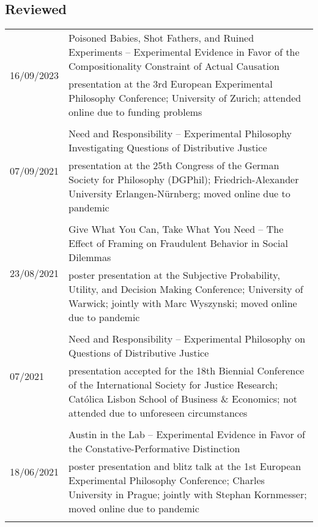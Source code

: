 \documentclass[a4paper,10pt]{article}
\begin{document}
\subsection*{Reviewed}
\begin{longtable}{p{}p{11cm}}
\multirow{2}{2,25cm}{\footnotesize{16/09/2023}} & Poisoned Babies, Shot Fathers, and Ruined Experiments -- Experimental Evidence in Favor of the Compositionality Constraint of Actual Causation\\
& \footnotesize{presentation at the 3rd European Experimental Philosophy Conference; University of Zurich; attended online due to funding problems}\\
\\
\multirow{2}{2,25cm}{\footnotesize{07/09/2021}} & Need and Responsibility -- Experimental Philosophy Investigating Questions of Distributive Justice\\
& \footnotesize{presentation at the 25th Congress of the German Society for Philosophy (DGPhil); Friedrich-Alexander University Erlangen-Nürnberg; moved online due to pandemic}\\
\\
\multirow{2}{2,25cm}{\footnotesize{23/08/2021}} & Give What You Can, Take What You Need -- The Effect of Framing on Fraudulent Behavior in Social Dilemmas\\
& \footnotesize{poster presentation at the Subjective Probability, Utility, and Decision Making Conference; University of Warwick; jointly with Marc Wyszynski; moved online due to pandemic}\\
\\
\multirow{2}{2,25cm}{\footnotesize{07/2021}} & Need and Responsibility -- Experimental Philosophy on Questions of Distributive Justice\\
& \footnotesize{presentation accepted for the 18th Biennial Conference of the International Society for Justice Research; Católica Lisbon School of Business \& Economics; not attended due to unforeseen circumstances}\\
\\
\multirow{2}{2,25cm}{\footnotesize{18/06/2021}} & Austin in the Lab -- Experimental Evidence in Favor of the Constative-Performative Distinction\\
& \footnotesize{poster presentation and blitz talk at the 1st European Experimental Philosophy Conference; Charles University in Prague; jointly with Stephan Kornmesser; moved online due to pandemic}\\
\\

\end{longtable}
\end{document}
